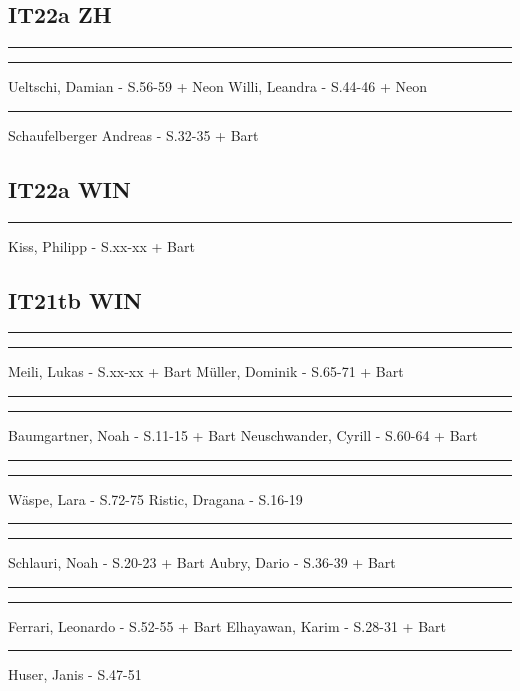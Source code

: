 \documentclass[fontsize=12pt,parskip=half]{scrartcl}
\begin{document}
\subsection*{IT22a ZH}
\vspace{50pt}
\noindent\rule{7cm}{.4pt}\hfill\rule{7cm}{.4pt}\par
\noindent Ueltschi, Damian - S.56-59 + Neon \hfill Willi, Leandra - S.44-46 + Neon

\vspace{50pt}
\noindent\rule{7cm}{.4pt}\hfill\par
\noindent Schaufelberger Andreas - S.32-35 + Bart\hfill

\subsection*{IT22a WIN}
\vspace{50pt}
\noindent\rule{7cm}{.4pt}\hfill\par
\noindent Kiss, Philipp - S.xx-xx + Bart \hfill

\subsection*{IT21tb WIN}
\vspace{50pt}
\noindent\rule{7cm}{.4pt}\hfill\rule{7cm}{.4pt}\par
\noindent Meili, Lukas - S.xx-xx + Bart \hfill Müller, Dominik - S.65-71 + Bart

\vspace{50pt}
\noindent\rule{7cm}{.4pt}\hfill\rule{7cm}{.4pt}\par
\noindent Baumgartner, Noah - S.11-15 + Bart \hfill Neuschwander, Cyrill - S.60-64 + Bart

\vspace{50pt}
\noindent\rule{7cm}{.4pt}\hfill\rule{7cm}{.4pt}\par
\noindent Wäspe, Lara - S.72-75 \hfill Ristic, Dragana - S.16-19

\vspace{50pt}
\noindent\rule{7cm}{.4pt}\hfill\rule{7cm}{.4pt}\par
\noindent Schlauri, Noah - S.20-23 + Bart \hfill Aubry, Dario - S.36-39 + Bart

\vspace{50pt}
\noindent\rule{7cm}{.4pt}\hfill\rule{7cm}{.4pt}\par
\noindent Ferrari, Leonardo - S.52-55 + Bart \hfill Elhayawan, Karim - S.28-31 + Bart

\vspace{50pt}
\noindent\rule{7cm}{.4pt}\par
\noindent Huser, Janis - S.47-51\hfill
\end{document}
